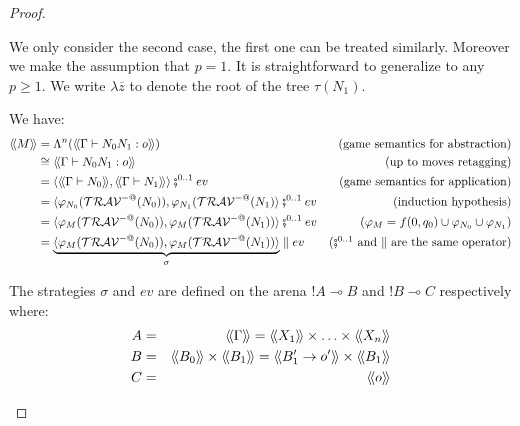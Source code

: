\begin{proof}
\begin{itemize}
    We only consider the second case, the first one can be treated
    similarly. Moreover we make the assumption that $p=1$. It is
    straightforward to generalize to any $p\geq1$.
    We write $\lambda \overline{z}$ to denote the root of the tree $\tau(N_1)$.


    We have:
    \begin{align*}
    \intersem{M}
        &=  \Lambda^n( \intersem{\Gamma \vdash N_0 N_1 : o} )
            & \mbox{(game semantics for abstraction)}\\
        &\cong  \intersem{\Gamma \vdash N_0 N_1 : o}
            & \mbox{(up to moves retagging)}\\
        &=  \langle \intersem{\Gamma \vdash N_0}, \intersem{\Gamma \vdash N_1} \rangle \fatsemi^{0..1} ev
            & \mbox{(game semantics for application)}\\
        &=  \langle \varphi_{N_0} (\travset^{-@}(N_0)), \varphi_{N_1}(\travset^{-@}(N_1) \rangle \fatsemi^{0..1} ev
            & \mbox{(induction hypothesis)}\\
        &=  \langle \varphi_{M} (\travset^{-@}(N_0)), \varphi_{M}(\travset^{-@}(N_1)) \rangle \fatsemi^{0..1} ev
            & \mbox{($\varphi_M = f(0,q_0) \union \varphi_{N_0} \union \varphi_{N_1}$)} \\
        &=  \underbrace{\langle \varphi_{M} (\travset^{-@}(N_0)), \varphi_{M}(\travset^{-@}(N_1)) \rangle}_{\sigma} \parallel ev
            & \mbox{($\fatsemi^{0..1}$ and $\parallel$ are the same operator)}
    \end{align*}


    The strategies $\sigma$ and $ev$ are defined on the arena $!A \multimap B$ and $!B \multimap C$ respectively where:
    \begin{eqnarray*}
        A &=& \intersem{\Gamma} = \intersem{X_1} \times \ldots \times \intersem{X_n}\\
        B &=& \intersem{B_0} \times \intersem{B_1} = \intersem{B_1' \rightarrow o'} \times \intersem{B_1} \\
        C &=& \intersem{o}
    \end{eqnarray*}


\end{itemize}
\end{proof}
